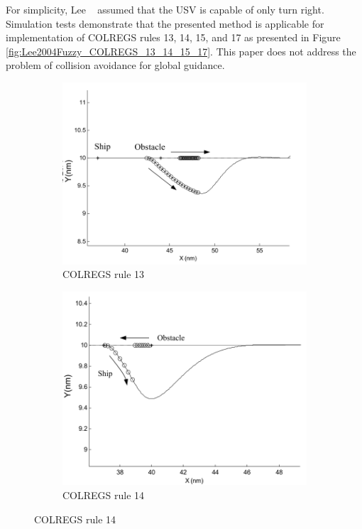     For simplicity, Lee \etal~\cite{Lee2004Fuzzy} assumed that the \ac{USV} is capable of only turn right. Simulation tests demonstrate that the presented method is applicable for implementation of \ac{COLREGS} rules 13, 14, 15, and 17 as presented in Figure \ref{fig:Lee2004Fuzzy_COLREGS_13_14_15_17}. This paper does not address the problem of collision avoidance for global guidance.
    \begin{figure}[H]
    \centering
    
        \begin{subfigure}[b]{0.5\textwidth}
            \centering
            \includegraphics[width=\textwidth]{figs/Chap3/Lee2004Fuzzy_COLREGS13.png}
            \caption{\ac{COLREGS} rule 13}
            \label{fig:Lee2004Fuzzy_COLREGS13}
        \end{subfigure}
        \begin{subfigure}[b]{0.45\textwidth}
            \centering
            \includegraphics[width=\textwidth]{figs/Chap3/Lee2004Fuzzy_COLREGS14.png}
            \caption{\ac{COLREGS} rule 14}
            \label{fig:Lee2004Fuzzy_COLREGS14}
        \end{subfigure}
        

\end{figure}

